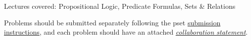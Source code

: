 \documentclass[handout]{mcs}
\begin{document}
\renewcommand{\reading}{
Chapter~\bref{logicform_chap}{.\ \emph{Logical Formulas}};
Chapter~\bref{data_chap}{.\ \emph{Mathematical Data
Types} through \bref{rel_sec}{.\ \emph{Binary Relations}.}}
}


\begin{staffnotes}
Lectures covered: Propositional Logic, Predicate Formulas, Sets \& Relations
\end{staffnotes}

Problems should be submitted separately following the pset
  \href{http://courses.csail.mit.edu/6.042/spring13/submission.shtml}
       {submission instructions}, and each problem should have an attached
  \href{http://courses.csail.mit.edu/6.042/spring13/submission_template.pdf}
       {\emph{collaboration statement}}.











\end{document}
